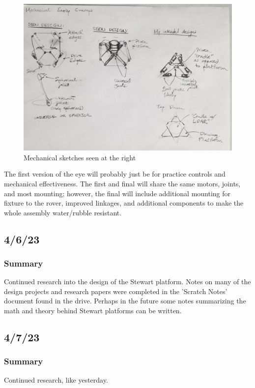 \documentclass[a4paper, 10pt]{article}
\begin{document}
		\begin{figure} [h]
			\centering
			\includegraphics[scale=0.2]{early_mechanical}
			\caption{Mechanical sketches seen at the right}
			\label{fig_1}
		\end{figure}
	
		The first version of the eye will probably just be for practice controls and mechanical effectiveness. The first and final will share the same motors, joints, and most mounting; however, the final will include additional mounting for fixture to the rover, improved linkages, and additional components to make the whole assembly water/rubble resistant. 
		
	\subsection{4/6/23}
		\subsubsection{Summary}
		Continued research into the design of the Stewart platform. Notes on many of the design projects and research papers were completed in the 'Scratch Notes' document found in the drive. Perhaps in the future some notes summarizing the math and theory behind Stewart platforms can be written.
	
	\subsection{4/7/23}
		\subsubsection{Summary}
		Continued research, like yesterday.
\end{document}
